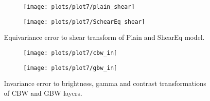     \begin{figure}[h!]
    \begin{adjustwidth}{-11em}{-11em}
        \centering
        \begin{subfigure}{0.55\textwidth}
            \texttt{[image: plots/plot7/plain\_shear]}
        \end{subfigure}
        \begin{subfigure}{0.55\textwidth}
            \texttt{[image: plots/plot7/SchearEq\_shear]}
        \end{subfigure}
    \end{adjustwidth}
        \caption{Equivariance error to shear transform of Plain and ShearEq
        model.}
        \label{fig:plot7shear}
    \end{figure}


    \begin{figure}[h!]
    \centering
        \begin{subfigure}{\textwidth}
            \texttt{[image: plots/plot7/cbw\_in]}
        \end{subfigure}
        \begin{subfigure}{\textwidth}
            \texttt{[image: plots/plot7/gbw\_in]}
        \end{subfigure}
        \caption{Invariance error to brightness, gamma and contrast
            transformations of CBW and GBW layers.}
        \label{fig:plot7inv}
    \end{figure}
